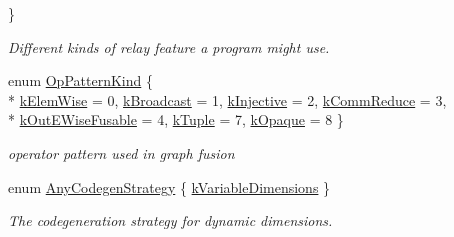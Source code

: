 \begin{DoxyCompactItemize}
 \}\begin{DoxyCompactList}\small\item\em Different kinds of relay feature a program might use. \end{DoxyCompactList}
\item 
enum \hyperlink{namespacetvm_1_1relay_ab5f4d382bf1bee69c3e484ea6c837578}{Op\+Pattern\+Kind} \{ \\*
\hyperlink{namespacetvm_1_1relay_ab5f4d382bf1bee69c3e484ea6c837578a8c63d345994ce14eb197df6ad22de3aa}{k\+Elem\+Wise} = 0, 
\hyperlink{namespacetvm_1_1relay_ab5f4d382bf1bee69c3e484ea6c837578a3c016b63ef8869468ab565c862713245}{k\+Broadcast} = 1, 
\hyperlink{namespacetvm_1_1relay_ab5f4d382bf1bee69c3e484ea6c837578a7f703d1ae163ba4e6bef88357a232e00}{k\+Injective} = 2, 
\hyperlink{namespacetvm_1_1relay_ab5f4d382bf1bee69c3e484ea6c837578ad282ac05b650598c3bfb559dc62a0738}{k\+Comm\+Reduce} = 3, 
\\*
\hyperlink{namespacetvm_1_1relay_ab5f4d382bf1bee69c3e484ea6c837578ab9b265465c486425c2f60cd4057e2ef4}{k\+Out\+E\+Wise\+Fusable} = 4, 
\hyperlink{namespacetvm_1_1relay_ab5f4d382bf1bee69c3e484ea6c837578ae5610688419b90595a0701fe007a2ebb}{k\+Tuple} = 7, 
\hyperlink{namespacetvm_1_1relay_ab5f4d382bf1bee69c3e484ea6c837578a3cb3cec00829ebd525feba875f2d6ac1}{k\+Opaque} = 8
 \}\begin{DoxyCompactList}\small\item\em operator pattern used in graph fusion \end{DoxyCompactList}
\item 
enum \hyperlink{namespacetvm_1_1relay_adab76fedc831b249d1c80d69c4a620a3}{Any\+Codegen\+Strategy} \{ \hyperlink{namespacetvm_1_1relay_adab76fedc831b249d1c80d69c4a620a3a1a3550732b0caf3981198af2c1373542}{k\+Variable\+Dimensions}
 \}\begin{DoxyCompactList}\small\item\em The codegeneration strategy for dynamic dimensions. \end{DoxyCompactList}
\end{DoxyCompactItemize}
